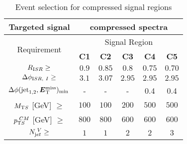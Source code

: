 {\begin{table}[tbp]
\begin{tabular}{|c|c|c|c|c|c|}
\hline
       Targeted signal & \multicolumn{5}{c|}{ compressed spectra } \\
       \hline \hline
      \multirow{2}{*}{Requirement}                                             & \multicolumn{5}{c|}{Signal Region}                                                           \\
 \cline{2-6}                                                                   & \textbf{ C1} & \textbf{ C2} & \textbf{ C3} & \textbf{ C4} & \textbf{ C5} \\
\hline
$R_{\textrm ISR} \geq $                                                        & $ 0.9$           & $ 0.85$          & $ 0.8$           & $ 0.75$          & $ 0.70$          \\ \hline
$ \Delta\phi_{\textrm ISR,~I} \geq$                                            & $ 3.1$           & $ 3.07$          & $ 2.95$          & $ 2.95$          & $ 2.95$          \\ \hline
$\Delta\phi(\textrm{jet}_{\textrm 1,2},\bm{E}\mathrm{^{miss}_T})_{\text{min}} \> $ & -                & -                & -                & 0.4              & 0.4              \\ \hline
$M_{\textrm T S}$ [GeV] $\geq$                                                 & $ 100$           & $ 100$           & $ 200$           & $ 500$           & $ 500$           \\ \hline
$p_{\textrm T S}^{\textrm ~CM}$ [GeV]  $\ge$                                   & $ 800$           & $ 800$           & $ 600$           & $ 600$           & $ 600$           \\ \hline
$N_{\textrm jet}^{\textrm ~V} \geq$                                            & $ 1$             & $ 1$             & $ 2$             & $ 2$             & $ 3$             \\
\hline

\end{tabular}
\caption{Event selection for compressed signal regions
\label{tab:compressed_srs}}
\end{table}
}


